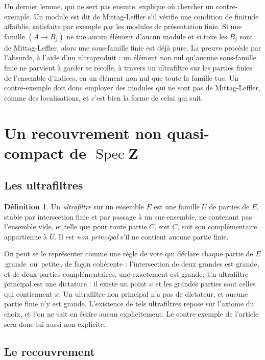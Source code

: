 \documentclass[11pt,a4paper]{amsart}
\theoremstyle{definition}
\newtheorem{definition}{Définition}
\theoremstyle{plain}
\theoremstyle{remark}
\newcommand{\Z}{\mathbf Z}
\newcommand{\Spec}{\operatorname{Spec}}
\begin{document}
Un dernier lemme, qui ne sert pas ensuite, explique où chercher un contre-exemple. Un module est dit de Mittag-Leffler s'il vérifie une condition de finitude affaiblie, satisfaite par exemple par les modules de présentation finie. Si une famille $(A\to B_j)$ ne tue aucun élément d'aucun module et si tous les $B_j$ sont de Mittag-Leffler, alors une sous-famille finie est déjà pure. La preuve procède par l'absurde, à l'aide d'un ultraproduit : un élément non nul qu'aucune sous-famille finie ne parvient à garder se recolle, à travers un ultrafiltre sur les parties finies de l'ensemble d'indices, en un élément non nul que toute la famille tue. Un contre-exemple doit donc employer des modules qui ne sont pas de Mittag-Leffler, comme des localisations, et c'est bien la forme de celui qui suit.

\section{Un recouvrement non quasi-compact de $\Spec\Z$}

\subsection{Les ultrafiltres}

\begin{definition}
Un \emph{ultrafiltre} sur un ensemble $E$ est une famille $U$ de parties de $E$, stable par intersection finie et par passage à un sur-ensemble, ne contenant pas l'ensemble vide, et telle que pour toute partie $C$, soit $C$, soit son complémentaire appartienne à $U$. Il est \emph{non principal} s'il ne contient aucune partie finie.
\end{definition}

On peut se le représenter comme une règle de vote qui déclare chaque partie de $E$ \guillemotleft\,grande\,\guillemotright{} ou \guillemotleft\,petite\,\guillemotright{}, de façon cohérente : l'intersection de deux grandes est grande, et de deux parties complémentaires, une exactement est grande. Un ultrafiltre principal est une dictature : il existe un point $x$ et les grandes parties sont celles qui contiennent $x$. Un ultrafiltre non principal n'a pas de dictateur, et aucune partie finie n'y est grande. L'existence de tels ultrafiltres repose sur l'axiome du choix, et l'on ne sait en écrire aucun explicitement. Le contre-exemple de l'article sera donc lui aussi non explicite.

\subsection{Le recouvrement}
\end{document}
